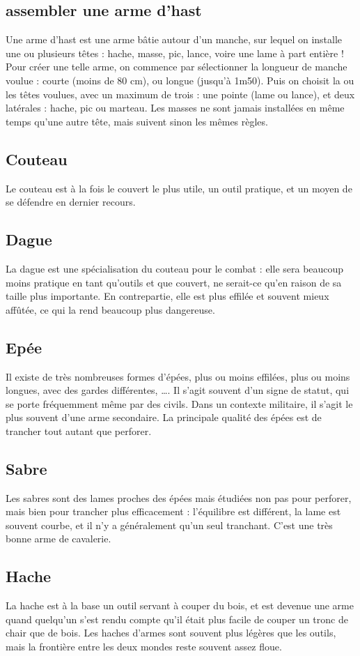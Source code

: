 \documentclass[10pt,a4paper,twocolumn]{book}
\begin{document}
\subsection*{assembler une arme d’hast}
Une arme d’hast est une arme bâtie autour d’un manche, sur lequel on installe une ou plusieurs têtes : hache, masse, pic, lance, voire une lame à part entière ! Pour créer une telle arme, on commence par sélectionner la longueur de manche voulue : courte (moins de 80 cm), ou longue (jusqu’à 1m50). Puis on choisit la ou les têtes voulues, avec un maximum de trois : une pointe (lame ou lance), et deux latérales : hache, pic ou marteau. Les masses ne sont jamais installées en même temps qu’une autre tête, mais suivent sinon les mêmes règles.
\subsection*{Couteau}
Le couteau est à la fois le couvert le plus utile, un outil pratique, et un moyen de se défendre en dernier recours.
\subsection*{Dague}
La dague est une spécialisation du couteau pour le combat : elle sera beaucoup moins pratique en tant qu’outils et que couvert, ne serait-ce qu’en raison de sa taille plus importante. En contrepartie, elle est plus effilée et souvent mieux affûtée, ce qui la rend beaucoup plus dangereuse.
\subsection*{Epée}
Il existe de très nombreuses formes d’épées, plus ou moins effilées, plus ou moins longues, avec des gardes différentes, …. Il s’agit souvent d’un signe de statut, qui se porte fréquemment même par des civils. Dans un contexte militaire, il s’agit le plus souvent d’une arme secondaire. La principale qualité des épées est de trancher tout autant que perforer.
\subsection*{Sabre}
Les sabres sont des lames proches des épées mais étudiées non pas pour perforer, mais bien pour trancher plus efficacement : l’équilibre est différent, la lame est souvent courbe, et il n'y a généralement qu'un seul tranchant. C'est une très bonne arme de cavalerie.
\subsection*{Hache}
La hache est à la base un outil servant à couper du bois, et est devenue une arme quand quelqu’un s’est rendu compte qu’il était plus facile de couper un tronc de chair que de bois. Les haches d’armes sont souvent plus légères que les outils, mais la frontière entre les deux mondes reste souvent assez floue. 
\end{document}
